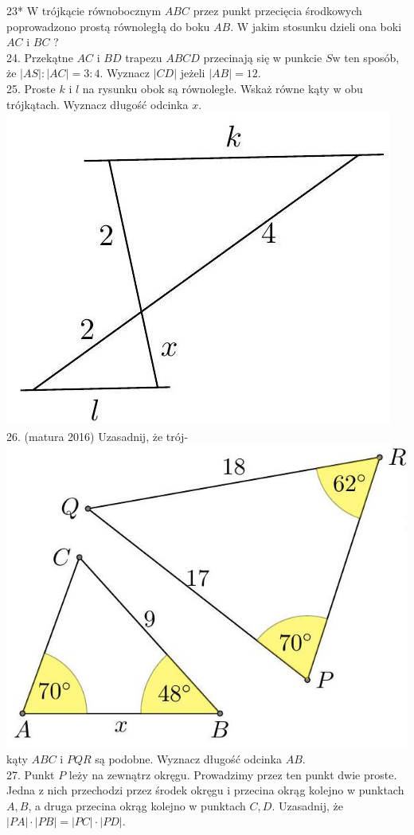 \documentclass[10pt]{article}
\begin{document}
23* W trójkącie równobocznym \(A B C\) przez punkt przecięcia środkowych poprowadzono prostą równoległą do boku \(A B\). W jakim stosunku dzieli ona boki \(A C\) i \(B C\) ?\\
24. Przekątne \(A C\) i \(B D\) trapezu \(A B C D\) przecinają się w punkcie \(S \mathrm{w}\) ten sposób, że \(|A S|:|A C|=3: 4\). Wyznacz \(|C D|\) jeżeli \(|A B|=12\).\\
25. Proste \(k\) i \(l\) na rysunku obok są równoległe. Wskaż równe kąty w obu trójkątach. Wyznacz długość odcinka \(x\).\\
\includegraphics[max width=\textwidth, center]{2024_11_21_e9b4faa005d5be2cc318g-026(2)}\\
26. (matura 2016) Uzasadnij, że trój-\\
\includegraphics[max width=\textwidth, center]{2024_11_21_e9b4faa005d5be2cc318g-026}\\
kąty \(A B C\) i \(P Q R\) są podobne. Wyznacz długość odcinka \(A B\).\\
27. Punkt \(P\) leży na zewnątrz okręgu. Prowadzimy przez ten punkt dwie proste. Jedna z nich przechodzi przez środek okręgu i przecina okrąg kolejno w punktach \(A, B\), a druga przecina okrąg kolejno w punktach \(C, D\). Uzasadnij, że \(|P A| \cdot|P B|=|P C| \cdot|P D|\).
\end{document}
